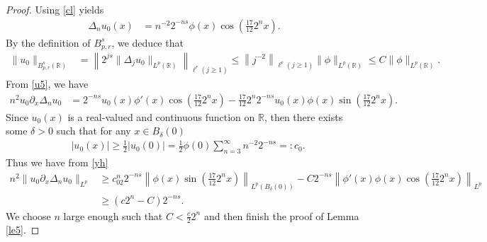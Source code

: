 \documentclass[12pt]{article}
\newcommand{\pa}{\partial}
\newcommand{\fr}{\frac}
\newcommand{\De}{\Delta}
\newcommand{\R}{\mathbb{R}}
\newcommand{\f}{\left}
\newcommand{\g}{\right}
\begin{document}
\begin{proof}\;
Using \eqref{cl} yields
\begin{align}\label{u5}
\De_{n}u_0(x)&=n^{-2}2^{-ns} \phi(x)\cos \f(\frac{17}{12}2^{n}x\g).
\end{align}
By the definition of ${B}_{p,r}^{s}$, we deduce that
\begin{align*}
 \|u_{0}\|_{{B}_{p,r}^{s}(\R)}&=\f\|2^{js}\|\Delta_{j}u_0\|_{L^p(\R)}\g\|_{\ell^r(j\geq1)}
\leq \f\|j^{-2}\g\|_{\ell^r(j\geq1)} \|\phi\|_{L^{p}(\R)}\leq C\|\phi\|_{L^{p}(\R)}.
\end{align*}
From \eqref{u5}, we have
\begin{align*}
n^2u_0\pa_x\De_{n}u_0&=2^{-ns} u_0(x)\phi'(x)\cos \f(\frac{17}{12}2^{n}x\g)-\frac{17}{12}2^{n}2^{-ns} u_0(x)\phi(x)\sin \f(\frac{17}{12}2^{n}x\g).
\end{align*}
Since $u_0(x)$ is a real-valued and continuous function on $\R$, then there exists some $\delta>0$ such that for any $x\in B_{\delta}(0)$
\begin{align}\label{yh}
&|u_0(x)|\geq \fr{1}{2}|u_0(0)|=\fr{1}{2}\phi(0)\sum\limits^{\infty}_{n=3}n^{-2}2^{-ns}=:c_0.
\end{align}
Thus we have from \eqref{yh}
\begin{align*}
n^2\|u_0\pa_x\De_{n}u_0\|_{L^p}
&\geq c_02^{n}2^{-ns} \f\|\phi(x)\sin \f(\frac{17}{12}2^{n}x\g)\g\|_{L^p(B_{\delta}(0))}-C2^{-ns}\f\| \phi'(x)\phi(x)\cos \f(\frac{17}{12}2^{n}x\g)\g\|_{L^p}\\
&\geq (c2^{n}-C)2^{-ns} .
\end{align*}
We choose $n$ large enough such that $C<\frac{c}{2}2^{n}$ and then finish the proof of Lemma \ref{le5}.
\end{proof}
\end{document}
